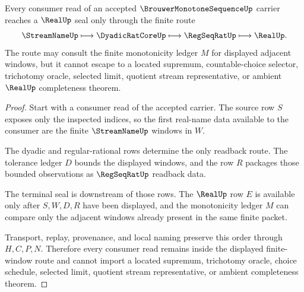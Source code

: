 \begin{theorem}
\label{thm:brouwer-monotone-sequence-finite-window-nonescape}
Every consumer read of an accepted $\BrouwerMonotoneSequenceUp$ carrier reaches a $\RealUp$ seal only through the finite route
$$
\StreamNameUp
\longmapsto
\DyadicRatCoreUp
\longmapsto
\RegSeqRatUp
\longmapsto
\RealUp .
$$
The route may consult the finite monotonicity ledger $M$ for displayed adjacent windows, but it cannot escape to a located supremum, countable-choice selector, trichotomy oracle, selected limit, quotient stream representative, or ambient $\RealUp$ completeness theorem.
\end{theorem}
\begin{proof}
Start with a consumer read of the accepted carrier. The source row $S$ exposes only the inspected indices, so the first real-name data available to the consumer are the finite $\StreamNameUp$ windows in $W$.

The dyadic and regular-rational rows determine the only readback route. The tolerance ledger $D$ bounds the displayed windows, and the row $R$ packages those bounded observations as $\RegSeqRatUp$ readback data.

The terminal seal is downstream of those rows. The $\RealUp$ row $E$ is available only after $S,W,D,R$ have been displayed, and the monotonicity ledger $M$ can compare only the adjacent windows already present in the same finite packet.

Transport, replay, provenance, and local naming preserve this order through $H,C,P,N$. Therefore every consumer read remains inside the displayed finite-window route and cannot import a located supremum, trichotomy oracle, choice schedule, selected limit, quotient stream representative, or ambient completeness theorem.
\end{proof}


\begin{closurestatus}{\BrouwerMonotoneSequenceUp}
  \theoryclosure{\seedClosure}
  \formalstatus{\unformalizedV}
\end{closurestatus}
